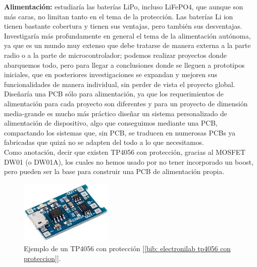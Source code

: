 \documentclass[12pt]{article}
\begin{document}
	\noindent \textbf{Alimentación:} estudiaría las baterías LiPo, incluso LiFePO4, que aunque son más caras, no limitan tanto en el tema de la protección. Las baterías Li ion tienen bastante cobertura y tienen sus ventajas, pero también sus desventajas. Investigaría más profundamente en general el tema de la alimentación autónoma, ya que es un mundo muy extenso que debe tratarse de manera externa a la parte radio o a la parte de microcontrolador; podemos realizar proyectos donde abarquemos todo, pero para llegar a conclusiones donde se lleguen a prototipos iniciales, que en posteriores investigaciones se expandan y mejoren sus funcionalidades de manera individual, sin perder de vista el proyecto global. Diseñaría una PCB sólo para alimentación, ya que los requerimientos de alimentación para cada proyecto son diferentes y para un proyecto de dimensión media-grande es mucho más práctico diseñar un sistema personalizado de alimentación de dispositivo, algo que conseguimos mediante una PCB, compactando los sistemas que, sin PCB, se traducen en numerosas PCBs ya fabricadas que quizá no se adapten del todo a lo que necesitamos. \\
	
		
	\noindent Como anotación, decir que existen TP4056 con protección, gracias al MOSFET DW01 (o DW01A), los cuales no hemos usado por no tener incorporado un boost, pero pueden ser la base para construir una PCB de alimentación propia. \\
	
	\begin{figure}[h]
		\begin{center}
			\includegraphics[width=0.4\textwidth]{img/tp4056_withProtection.png}
			\caption{Ejemplo de un TP4056 con protección [\ref{bib: electronilab tp4056 con proteccion}].}
			\label{TP4056 con protección}
		\end{center}
	\end{figure}
	
\end{document}
